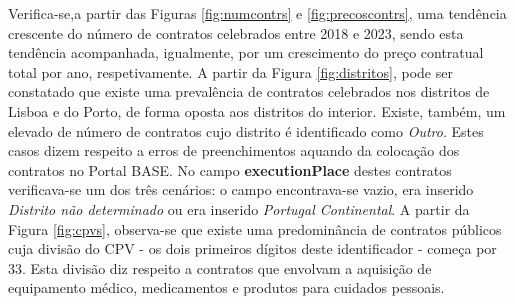 

Verifica-se,a partir das Figuras \ref{fig:numcontrs} e \ref{fig:precoscontrs}, uma tendência crescente do número de contratos celebrados entre 2018 e 2023, sendo esta tendência acompanhada, igualmente, por um crescimento do preço contratual total por ano, respetivamente. A partir da Figura \ref{fig:distritos}, pode ser constatado que existe uma prevalência de contratos celebrados nos distritos de Lisboa e do Porto, de forma oposta aos distritos do interior. Existe, também, um elevado de número de contratos cujo distrito é identificado como \textit{Outro}. Estes casos dizem respeito a erros de preenchimentos aquando da colocação dos contratos no Portal BASE. No campo \textbf{executionPlace} destes contratos verificava-se um dos três cenários: o campo encontrava-se vazio, era inserido \textit{Distrito não determinado} ou era inserido \textit{Portugal Continental}. 
A partir da Figura \ref{fig:cpvs}, observa-se que existe uma predominância de contratos públicos cuja divisão do CPV - os dois primeiros dígitos deste identificador - começa por 33. Esta divisão diz respeito a contratos que envolvam a aquisição de equipamento médico, medicamentos e produtos para cuidados pessoais. 



\begin{table}[H]
	\centering
	\renewcommand{\arraystretch}{1.35}
	\setlength{\tabcolsep}{20pt}
	\caption{Descrição das principais divisões de CPV}
	\label{tab:maincpvs}
\end{table}


